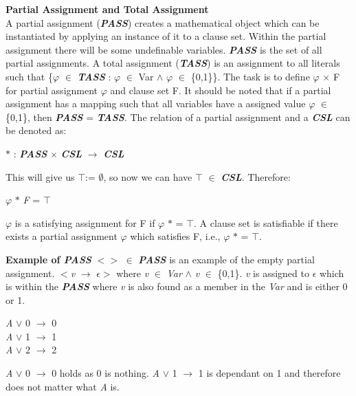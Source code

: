 \documentclass[11pt,a4paper]{report}
\begin{document}
\textbf{Partial Assignment and Total Assignment}\\
\indent A partial assignment (\textbf{\textit{PASS}}) creates a mathematical object which can be instantiated by applying an instance of it to a clause set. Within the partial assignment there will be some undefinable variables. \textbf{\textit{PASS}} is the set of all partial assignments. 
A total assignment (\textbf{\textit{TASS}}) is an assignment to all literals such that \{\textit{$\varphi$} $\in$ \textbf{\textit{TASS}} : \textit{$\varphi$} $\in$ Var $\land$ \textit{$\varphi$} $\in$ \{0,1\}\}. The task is to define $\varphi$ $\times$ F for partial assignment $\varphi$ and clause set F. It should be noted that if a partial assignment has a mapping such that all variables have a assigned value \textit{$\varphi$} $\in$
\{0,1\}, then \textbf{\textit{PASS}} = \textbf{\textit{TASS}}. 
The relation of a partial assignment and a \textbf{\textit{CSL}} can be denoted as: 
 
\begin{center}
$\ast$ : \textbf{\textit{PASS}} $\times$ \textbf{\textit{CSL}} $\rightarrow$ \textbf{\textit{CSL}}
\end{center}
This will give us $\top$:= $\emptyset$, so now we can have $\top$ $\in$ \textbf{\textit{CSL}}. Therefore:

\begin{center}
$\varphi$ $\ast$ \textit{F} = $\top$
\end{center}
$\varphi$ is a satisfying assignment for F if $\varphi$ $\ast$ = $\top$. A clause set is satisfiable if there exists a partial assignment $\varphi$ which satisfies F, i.e., $\varphi$ $\ast$ = $\top$. 

\textbf{Example of \textbf{\textit{PASS}}}
$<>$ $\in$ \textbf{\textit{PASS}} is an example of the empty partial assignment.
$<$\textit{v} $\rightarrow$ $\epsilon$$>$ where \textit{v} $\in$ \textit{Var} $\land$ \textit{v} $\in$ \{0,1\}. \textit{v} is assigned to $\epsilon$ which is within the \textbf{\textit{PASS}} where \textit{v} is also found as a member in the \textit{Var} and is either 0 or 1. 

\begin{center}
\textit{A} $\lor$ 0 $\rightarrow$ 0 \\
\textit{A} $\lor$ 1 $\rightarrow$ 1 \\
\textit{A} $\lor$ 2 $\rightarrow$ 2
\end{center}
\textit{A} $\lor$ 0 $\rightarrow$ 0 holds as 0 is nothing. \textit{A} $\lor$ 1 $\rightarrow$ 1 is dependant on 1 and therefore does not matter what \textit{A} is.
\end{document}
